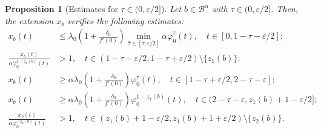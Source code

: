 \documentclass[a4paper,11pt]{article}
\theoremstyle{plain}
\newtheorem{prop}[thm]{Proposition}
\theoremstyle{definition}
\theoremstyle{definition}
\newcommand{\B}{\mathcal{B}}
\numberwithin{equation}{section}
\begin{document}
\begin{prop}[Estimates for $\tau\in(0,\varepsilon/2{]}$]\label{prop:estimates1}
Let $b\in\B^\alpha$ with $\tau\in(0,\varepsilon/2]$. Then, the extension $x_b$ verifies the following estimates:
\begin{align}
    x_b(t) &\leq \lambda_0 \left( 1+\frac{\delta_0}{f'(0)} \right) \min_{\hat{\tau}\in [\tau,\varepsilon/2]} \alpha \varphi_0^{\hat{\tau}} (t), \quad t\in[0,1-\tau-\varepsilon/2]; \label{estimate1} \\ 
    \frac{x_b(t)}{\alpha \varphi_0^{1-z_1(b)}(t)} &>1, \quad t\in(1-\tau-\varepsilon/2,1-\tau+\varepsilon/2) \setminus \{ z_1(b) \}; \label{stepness} \\     
    x_b(t) &\geq \alpha\lambda_0 \left( 1+\frac{\delta_0}{f'(0)} \right) \varphi_0^\tau (t), \quad t\in[1-\tau+\varepsilon/2, 2-\tau-\varepsilon];\label{estimate2} \\
    x_b(t) &\geq \alpha\lambda_0 \left( 1+\frac{\delta_0}{f'(0)} \right)\varphi_0^{1-z_1(b)}(t), \quad t\in(2-\tau-\varepsilon,z_1(b)+1-\varepsilon/2]; \label{estimate3} \\ 
    \frac{x_b(t)}{\alpha \varphi_0^{-z_2(b)}(t)} &>1, \quad t\in(z_1(b)+1-\varepsilon/2,z_1(b)+1+\varepsilon/2) \setminus\{ z_2(b) \} \label{stepness2}.
\end{align}
\end{prop}
\end{document}
